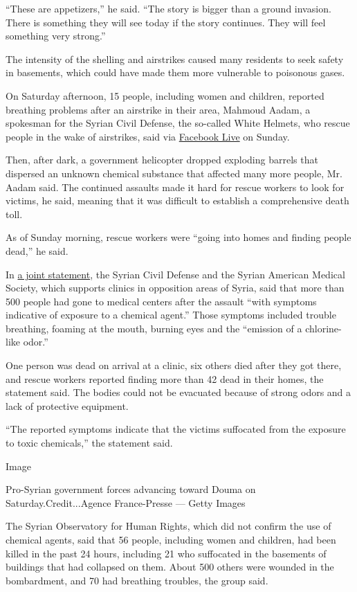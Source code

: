 ``These are appetizers,'' he said. ``The story is bigger than a ground
invasion. There is something they will see today if the story continues.
They will feel something very strong.''

The intensity of the shelling and airstrikes caused many residents to
seek safety in basements, which could have made them more vulnerable to
poisonous gases.

On Saturday afternoon, 15 people, including women and children, reported
breathing problems after an airstrike in their area, Mahmoud Aadam, a
spokesman for the Syrian Civil Defense, the so-called White Helmets, who
rescue people in the wake of airstrikes, said via
\href{https://www.facebook.com/SCDrifdimashq/videos/2186279348064029/}{Facebook
Live} on Sunday.

Then, after dark, a government helicopter dropped exploding barrels that
dispersed an unknown chemical substance that affected many more people,
Mr. Aadam said. The continued assaults made it hard for rescue workers
to look for victims, he said, meaning that it was difficult to establish
a comprehensive death toll.

As of Sunday morning, rescue workers were ``going into homes and finding
people dead,'' he said.

In
\href{https://www.sams-usa.net/press_release/sams-syrian-civil-defense-condemn-chemical-attack-douma/}{a
joint statement}, the Syrian Civil Defense and the Syrian American
Medical Society, which supports clinics in opposition areas of Syria,
said that more than 500 people had gone to medical centers after the
assault ``with symptoms indicative of exposure to a chemical agent.''
Those symptoms included trouble breathing, foaming at the mouth, burning
eyes and the ``emission of a chlorine-like odor.''

One person was dead on arrival at a clinic, six others died after they
got there, and rescue workers reported finding more than 42 dead in
their homes, the statement said. The bodies could not be evacuated
because of strong odors and a lack of protective equipment.

``The reported symptoms indicate that the victims suffocated from the
exposure to toxic chemicals,'' the statement said.

Image

Pro-Syrian government forces advancing toward Douma on
Saturday.Credit...Agence France-Presse --- Getty Images

The Syrian Observatory for Human Rights, which did not confirm the use
of chemical agents, said that 56 people, including women and children,
had been killed in the past 24 hours, including 21 who suffocated in the
basements of buildings that had collapsed on them. About 500 others were
wounded in the bombardment, and 70 had breathing troubles, the group
said.


